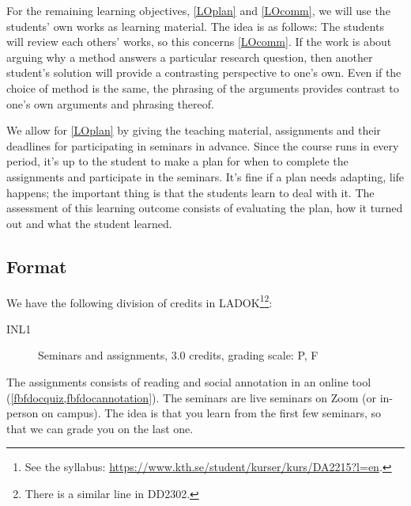 For the remaining learning objectives, \ref{LOplan} and \ref{LOcomm}, we will 
use the students' own works as learning material.
The idea is as follows:
The students will review each others' works, so this concerns \ref{LOcomm}.
If the work is about arguing why a method answers a particular research 
question, then another student's solution will provide a contrasting 
perspective to one's own.
Even if the choice of method is the same, the phrasing of the arguments 
provides contrast to one's own arguments and phrasing thereof.

We allow for \ref{LOplan} by giving the teaching material, assignments and 
their deadlines for participating in seminars in advance.
Since the course runs in every period, it's up to the student to make a plan 
for when to complete the assignments and participate in the seminars.
It's fine if a plan needs adapting, life happens; the important thing is that 
the students learn to deal with it.
The assessment of this learning outcome consists of evaluating the plan, how it 
turned out and what the student learned.

\subsection{Format}

We have the following division of credits in LADOK\footnote{%
  See the syllabus:
  \url{https://www.kth.se/student/kurser/kurs/DA2215?l=en}.
}\footnote{%
  There is a similar line in DD2302.
}:
\begin{description}
  \item[INL1] Seminars and assignments, 3.0 credits, grading scale: P, F
\end{description}

The assignments consists of reading and social annotation in an online tool 
(\cref{fbfdocquiz,fbfdocannotation}).
The seminars are live seminars on Zoom (or in-person on campus).
The idea is that you learn from the first few seminars, so that we can grade 
you on the last one.

